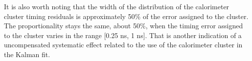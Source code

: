 
It is also worth noting that the width of the distribution of the calorimeter cluster timing
residuals is approximately 50\% of the error assigned to the cluster.
The proportionality stays the same, about 50\%,  when the timing error assigned to the cluster
varies in the range [0.25 ns, 1 ns]. That is another indication of a uncompensated systematic effect
related to the use of the calorimeter cluster in the Kalman fit.

\begin{figure}[h]
  \hspace{-0.8in}
\end{figure}
